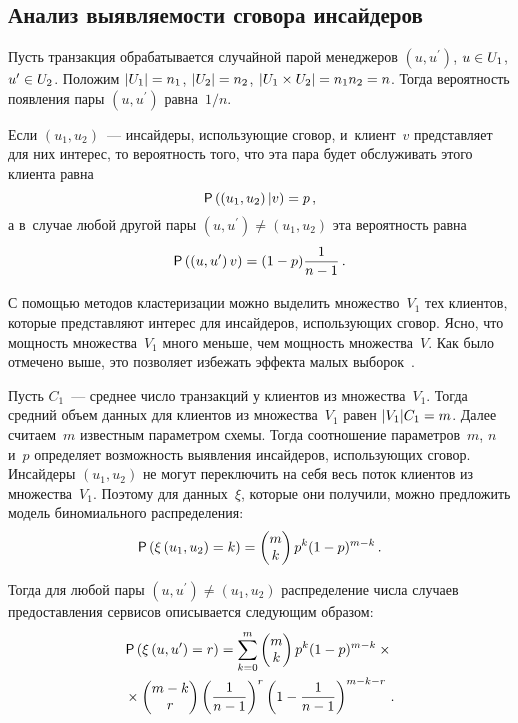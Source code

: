 \begin{multicols}{2}
  \vspace*{-4pt}
  
  \section{Анализ выявляемости сговора инсайдеров}
  
  \vspace*{-3pt}
  
  Пусть транзакция обрабатывается случайной парой менеджеров $(u, u^\prime)$, 
$u\hm\in U_1$, $u^\prime\hm\in U_2$. Положим $\vert U_1\vert \hm= n_1$, $\vert 
U_2 \vert \hm= n_2$, $\vert U_1\times U_2 \vert \hm= n_1  n_2 \hm= n$. Тогда 
вероятность появления пары $(u, u^\prime)$ равна~$1/n$. 
  
  Если $(u_1, u_2)$~--- инсайдеры, использующие сговор, и~клиент~$v$ 
представляет для них интерес, то вероятность того, что эта пара будет 
обслуживать этого клиента равна 
  $$
  {\sf P}\left(\left(u_1,u_2\right)\vert v\right)=p\,,
  $$
  а в~случае любой другой пары $(u, u^\prime) \not= (u_1, u_2)$ эта вероятность 
равна
  $$
  {\sf P}\left( \left( u, u^\prime\right) v\right)= (1-p)\displaystyle\frac{\displaystyle 1\mathstrut}{\displaystyle n-1\mathstrut}\,.
  $$
  
  С помощью методов кластеризации можно выделить множество~$V_1$ тех 
клиентов, которые представляют интерес для инсайдеров, использующих сговор. 
Ясно, что мощность множества~$V_1$ много меньше, чем мощность 
множества~$V$. Как было отмечено выше, это позволяет избежать эффекта малых 
выборок~\cite{6-gr}. 
  
  Пусть $C_1$~--- среднее число транзакций у клиентов из множества~$V_1$. 
Тогда средний объем данных для клиентов из множества~$V_1$ равен $\vert 
V_1\vert  C_1\hm=m$. Далее считаем~$m$ известным параметром схемы. 
Тогда соотношение параметров~$m$, $n$ и~$p$ определяет возможность выявления 
инсайдеров, использующих сговор. Инсайдеры $(u_1, u_2)$ не могут переключить 
на себя весь поток клиентов из множества~$V_1$. Поэтому для данных~$\xi$, 
которые они получили, можно предложить модель биномиального распределения: 
  $$
 {\sf P}\left( \xi\left ( u_1, u_2\right)=k\right) =
  \begin{pmatrix}
  m\\ k
  \end{pmatrix} p^k (1-p)^{m-k}\,.
  $$
  
  Тогда для любой пары $(u, u^\prime) \not= (u_1, u_2)$ распределение числа 
случаев предоставления сервисов описывается следующим образом:
 \begin{multline*}
{\sf P}\left(\xi\left( u,u^\prime\right)=r\right) =\sum\limits^m_{k=0} \begin{pmatrix}
  m\\ k\end{pmatrix} p^k (1-p)^{m-k}\times{}\\
  {}\times \begin{pmatrix}
  m-k\\ r\end{pmatrix}
  \left(\displaystyle\frac{\displaystyle 1\mathstrut}{\displaystyle n-1\mathstrut}\right)^r \left( 1-\displaystyle\frac{\displaystyle 1\mathstrut}{\displaystyle n-1\mathstrut}\right)^{m-k-r}\,.
  \end{multline*}
  

\end{multicols}

